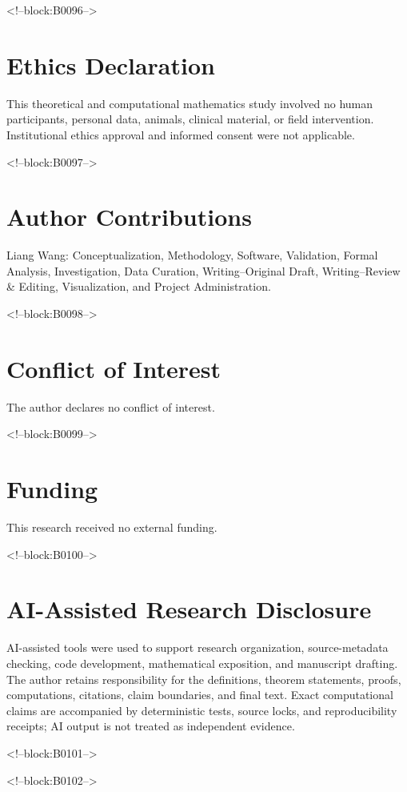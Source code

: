 \documentclass[11pt]{article}
\theoremstyle{definition}
\theoremstyle{remark}
\begin{document}
<!--block:B0096-->
\section*{Ethics Declaration}
This theoretical and computational mathematics study involved no human participants, personal data, animals, clinical material, or field intervention. Institutional ethics approval and informed consent were not applicable.

<!--block:B0097-->
\section*{Author Contributions}
Liang Wang: Conceptualization, Methodology, Software, Validation, Formal Analysis, Investigation, Data Curation, Writing--Original Draft, Writing--Review \& Editing, Visualization, and Project Administration.

<!--block:B0098-->
\section*{Conflict of Interest}
The author declares no conflict of interest.

<!--block:B0099-->
\section*{Funding}
This research received no external funding.

<!--block:B0100-->
\section*{AI-Assisted Research Disclosure}
AI-assisted tools were used to support research organization, source-metadata checking, code development, mathematical exposition, and manuscript drafting. The author retains responsibility for the definitions, theorem statements, proofs, computations, citations, claim boundaries, and final text. Exact computational claims are accompanied by deterministic tests, source locks, and reproducibility receipts; AI output is not treated as independent evidence.

<!--block:B0101-->
\begingroup
\raggedright


\endgroup

<!--block:B0102-->
\end{document}
